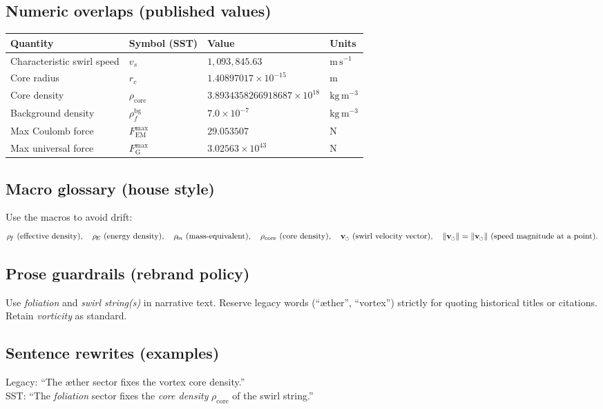\documentclass[11pt]{article}
\newcommand{\swirlarrow}{%
	\mathchoice{\mkern-2mu\scriptstyle\boldsymbol{\circlearrowleft}}%
	{\mkern-2mu\scriptstyle\boldsymbol{\circlearrowleft}}%
	{\mkern-2mu\scriptscriptstyle\boldsymbol{\circlearrowleft}}%
	{\mkern-2mu\scriptscriptstyle\boldsymbol{\circlearrowleft}}%
}
\newcommand{\vswirl}{\mathbf{v}_{\swirlarrow}}
\newcommand{\vscore}{v_s}                                %
\newcommand{\vnorm}{\lVert \vswirl \rVert}               %
\newcommand{\rhoF}{\rho_{\!f}}                           %
\newcommand{\rhoE}{\rho_{\!E}}                           %
\newcommand{\rhoM}{\rho_{\!m}}                           %
\newcommand{\rhoC}{\rho_{\mathrm{core}}} %
\newcommand{\FmaxEM}{F_{\mathrm{EM}}^{\max}}             %
\newcommand{\FmaxG}{F_{\mathrm{G}}^{\max}}               %
\begin{document}
	\subsection*{Numeric overlaps (published values)}
		\begin{center}
			\begin{tabular}{llll}
				\hline
				\textbf{Quantity} & \textbf{Symbol (SST)} & \textbf{Value} & \textbf{Units} \\
				\hline
				Characteristic swirl speed & $\vscore$ & $1{,}093{,}845.63$ & $\mathrm{m\,s^{-1}}$ \\
				Core radius & $r_c$ & $1.40897017\times 10^{-15}$ & $\mathrm{m}$ \\
				Core density & $\rhoC$ & $3.8934358266918687\times 10^{18}$ & $\mathrm{kg\,m^{-3}}$ \\
				Background density & $\rhoF^{\mathrm{bg}}$ & $7.0\times 10^{-7}$ & $\mathrm{kg\,m^{-3}}$ \\
				Max Coulomb force & $\FmaxEM$ & $29.053507$ & $\mathrm{N}$ \\
				Max universal force & $\FmaxG$ & $3.02563\times 10^{43}$ & $\mathrm{N}$ \\
				\hline
			\end{tabular}
		\end{center}

	\subsection*{Macro glossary (house style)}
		Use the macros to avoid drift:
		\[
			\rhoF\ (\text{effective density}),\quad
			\rhoE\ (\text{energy density}),\quad
			\rhoM\ (\text{mass-equivalent}),\quad
			\rhoC\ (\text{core density}),\quad
            \vswirl\ (\text{swirl velocity vector}),\quad
            \vnorm=\lVert\vswirl\rVert\ (\text{speed magnitude at a point}) .
		\]

	\subsection*{Prose guardrails (rebrand policy)}
		Use \emph{foliation} and \emph{swirl string(s)} in narrative text. Reserve legacy words (``æther'', ``vortex'') strictly for quoting historical titles or citations. Retain \emph{vorticity} as standard.

	\subsection*{Sentence rewrites (examples)}
		Legacy: “The æther sector fixes the vortex core density.”\\
		SST: “The \emph{foliation} sector fixes the \emph{core density} $\rhoC$ of the swirl string.”
\end{document}
